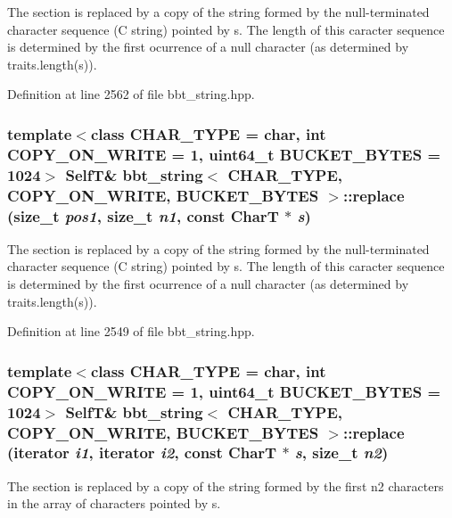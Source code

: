 The section is replaced by a copy of the string formed by the null-terminated character sequence (C string) pointed by s. The length of this caracter sequence is determined by the first ocurrence of a null character (as determined by traits.length(s)). 

Definition at line 2562 of file bbt\_\-string.hpp.\hypertarget{classbbt__string_1bca4b60b45b77a1c806d63f8d441082}{
\subsubsection[{replace}]{\setlength{\rightskip}{0pt plus 5cm}template$<$class CHAR\_\-TYPE  = char, int COPY\_\-ON\_\-WRITE = 1, uint64\_\-t BUCKET\_\-BYTES = 1024$>$ {\bf SelfT}\& {\bf bbt\_\-string}$<$ CHAR\_\-TYPE, COPY\_\-ON\_\-WRITE, BUCKET\_\-BYTES $>$::replace (size\_\-t {\em pos1}, \/  size\_\-t {\em n1}, \/  const CharT $\ast$ {\em s})}}
\label{classbbt__string_1bca4b60b45b77a1c806d63f8d441082}


The section is replaced by a copy of the string formed by the null-terminated character sequence (C string) pointed by s. The length of this caracter sequence is determined by the first ocurrence of a null character (as determined by traits.length(s)). 

Definition at line 2549 of file bbt\_\-string.hpp.\hypertarget{classbbt__string_1e73d6742c06f347e28afdfc9a9c3a6c}{
\subsubsection[{replace}]{\setlength{\rightskip}{0pt plus 5cm}template$<$class CHAR\_\-TYPE  = char, int COPY\_\-ON\_\-WRITE = 1, uint64\_\-t BUCKET\_\-BYTES = 1024$>$ {\bf SelfT}\& {\bf bbt\_\-string}$<$ CHAR\_\-TYPE, COPY\_\-ON\_\-WRITE, BUCKET\_\-BYTES $>$::replace (iterator {\em i1}, \/  iterator {\em i2}, \/  const CharT $\ast$ {\em s}, \/  size\_\-t {\em n2})}}
\label{classbbt__string_1e73d6742c06f347e28afdfc9a9c3a6c}


The section is replaced by a copy of the string formed by the first n2 characters in the array of characters pointed by s. 

